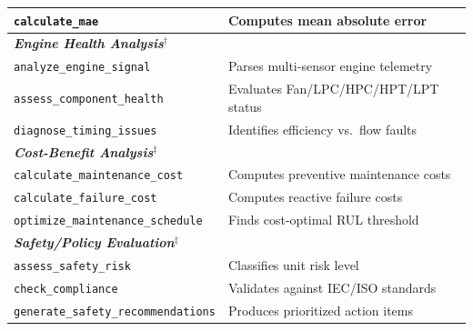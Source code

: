 \documentclass[sigconf]{acmart}
\begin{document}
\begin{table}[t]
\begin{tabular}{@{}ll@{}}
  \texttt{calculate\_mae} & Computes mean absolute error \\                                
  \midrule                                                                                 
  \multicolumn{2}{l}{\textbf{\textit{Engine Health Analysis}$^\dagger$}} \\                         
  \texttt{analyze\_engine\_signal} & Parses multi-sensor engine telemetry \\               
  \texttt{assess\_component\_health} & Evaluates Fan/LPC/HPC/HPT/LPT status \\             
  \texttt{diagnose\_timing\_issues} & Identifies efficiency vs.\ flow faults \\            
  \midrule                                                                                 
  \multicolumn{2}{l}{\textbf{\textit{Cost-Benefit Analysis}$^\ddagger$}} \\                         
  \texttt{calculate\_maintenance\_cost} & Computes preventive maintenance costs \\         
  \texttt{calculate\_failure\_cost} & Computes reactive failure costs \\                   
  \texttt{optimize\_maintenance\_schedule} & Finds cost-optimal RUL threshold \\           
  \midrule                                                                                 
  \multicolumn{2}{l}{\textbf{\textit{Safety/Policy Evaluation}$^\ddagger$}} \\                      
  \texttt{assess\_safety\_risk} & Classifies unit risk level \\                            
  \texttt{check\_compliance} & Validates against IEC/ISO standards \\                      
  \texttt{generate\_safety\_recommendations} & Produces prioritized action items \\        
  \bottomrule                                                                              
  \end{tabular}                                                                            
  \end{table}                             
\end{document}
